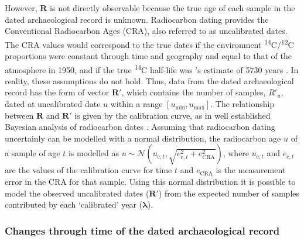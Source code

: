 \documentclass[a4paper]{article}
\begin{document}
However, $\bm{R}$ is not directly observable because the true age of each sample in the dated archaeological record is unknown. Radiocarbon dating provides the Conventional Radiocarbon Ages (CRA), also referred to as uncalibrated dates. The CRA values would correspond to the true dates if the environment \textsuperscript{14}C/\textsuperscript{12}C proportions were constant through time and geography and equal to that of the atmosphere in 1950, and if the true \textsuperscript{14}C half-life was \citeauthor{Libby1949}'s \parencite*{Libby1949} estimate of 5730 years \parencite{BronkRamsey2008}. In reality, these assumptions do not hold. Thus, data from the dated archaeological record has the form of vector $\bm{R'}$, which contains the number of samples, $R'_u$, dated at uncalibrated date $u$ within a range $\left[u_{\mathrm{min}},u_{\mathrm{max}}\right]$. The relationship between $\bm{R}$ and $\bm{R'}$ is given by the calibration curve, as in well established Bayesian analysis of radiocarbon dates \parencite{BronkRamsey2008}. Assuming that radiocarbon dating uncertainly can be modelled with a normal distribution, the radiocarbon age $u$ of a sample of age $t$ is modelled as $u \sim \mathcal{N}\left(u_{\mathrm{c},t},\sqrt{e_{\mathrm{c},t}^2+e_{\mathrm{CRA}}^2}\right)$, where $u_{\mathrm{c},t}$ and $e_{\mathrm{c},t}$ are the values of the calibration curve for time $t$ and $e_{\mathrm{CRA}}$ is the measurement error in the CRA for that sample. Using this normal distribution it is possible to model the observed uncalibrated dates ($\bm{R'}$) from the expected number of samples contributed by each `calibrated' year ($\bm{\lambda}$).
\\


\subsubsection*{Changes through time of the dated archaeological record}
\end{document}
